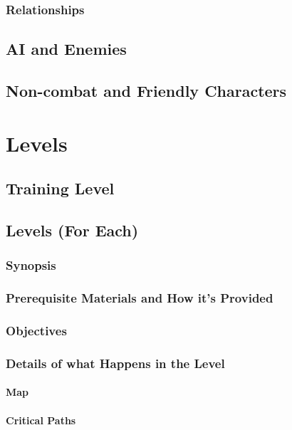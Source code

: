 \documentclass[12pt]{article}
\begin{document}
\subsubsection{Relationships}

\subsection{AI and Enemies}

\subsection{Non-combat and Friendly Characters}

\section{Levels}

\subsection{Training Level}

\subsection{Levels (For Each)}

\subsubsection{Synopsis}

\subsubsection{Prerequisite Materials and How it's Provided}

\subsubsection{Objectives}

\subsubsection{Details of what Happens in the Level}

\paragraph{Map}

\paragraph{Critical Paths}
\end{document}
